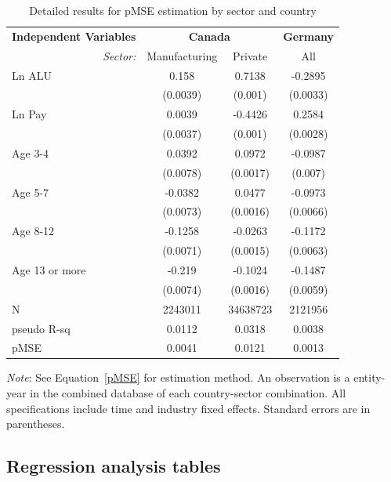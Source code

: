 \documentclass[10pt,twoside]{article}
\begin{document}
\begin{table}[!htbp] \centering 
\setlength{\tabcolsep}{11pt}
\begin{threeparttable}
  \caption{Detailed results for pMSE estimation by sector and country} 
  \label{tab:pmse:details} 
\begin{tabular}{@{\extracolsep{5pt}} l|cc|c} 
\toprule
\textbf{Independent Variables} & \multicolumn{2}{c|}{\textbf{Canada}} & \textbf{Germany}\\
\multicolumn{1}{r|}{\it Sector:}&Manufacturing & Private & All \\ 
\midrule
Ln ALU & 0.158 & 0.7138 & -0.2895 \\ 
 & (0.0039) & (0.001) & (0.0033)\\
Ln Pay & 0.0039 & -0.4426 & 0.2584 \\ 
 & (0.0037) & (0.001) & (0.0028)\\
Age 3-4 & 0.0392 & 0.0972 & -0.0987 \\ 
 & (0.0078) & (0.0017) & (0.007)\\ 
Age 5-7 & -0.0382 & 0.0477 & -0.0973 \\ 
 & (0.0073) & (0.0016) & (0.0066)\\ 
Age 8-12 & -0.1258 & -0.0263 & -0.1172 \\ 
 & (0.0071) & (0.0015) & (0.0063)\\ 
Age 13 or more & -0.219 & -0.1024 & -0.1487 \\ 
 & (0.0074) & (0.0016) & (0.0059)\\ 
 \midrule
N & 2243011 & 34638723 & 2121956 \\ 
pseudo R-sq & 0.0112 & 0.0318 & 0.0038 \\ 
\midrule
pMSE & 0.0041 & 0.0121 & 0.0013 \\ 
\bottomrule
\end{tabular} 
\begin{tablenotes}
\small
\item \textit{Note}: See Equation~\ref{pMSE} for estimation method. An observation is a entity-year in the combined database of each country-sector combination. All specifications include  time and industry fixed effects. Standard errors are in parentheses. 
\end{tablenotes}
\end{threeparttable}
\end{table} 
 
\subsection{Regression analysis tables}
\label{sec:regression_tables}
\end{document}
